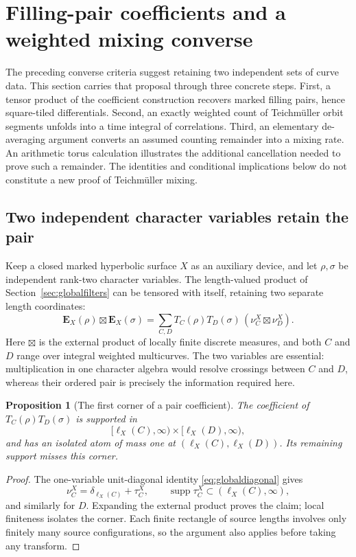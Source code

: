 \documentclass[11pt,a4paper]{article}
\numberwithin{equation}{section}
\newtheorem{proposition}[theorem]{Proposition}
\theoremstyle{definition}
\theoremstyle{remark}
\begin{document}
\clearpage
\section{Filling-pair coefficients and a weighted mixing converse}
\label{sec:pairconverse}

The preceding converse criteria suggest retaining two independent
sets of curve data.  This section carries that proposal through three
concrete steps.  First, a tensor product of the coefficient construction
recovers marked filling pairs, hence square-tiled differentials.
Second, an exactly weighted count of Teichm\"uller orbit segments
unfolds into a time integral of correlations.  Third, an elementary
de-averaging argument converts an assumed counting remainder into
a mixing rate.  An arithmetic torus calculation illustrates the
additional cancellation needed to prove such a remainder.  The
identities and conditional implications below do not constitute a new
proof of Teichm\"uller mixing.

\subsection{Two independent character variables retain the pair}
\label{subsec:paircoefficients}

Keep a closed marked hyperbolic surface $X$ as an auxiliary device,
and let $\rho,\sigma$ be independent rank-two character variables.
The length-valued product of Section~\ref{sec:globalfilters} can be
tensored with itself, retaining two separate length coordinates:
\[
 \mathbf E_X(\rho)\boxtimes\mathbf E_X(\sigma)
 =\sum_{C,D} T_C(\rho)T_D(\sigma)\,
       (\nu_C^X\boxtimes\nu_D^X).
\]
Here $\boxtimes$ is the external product of locally finite discrete
measures, and both $C$ and $D$ range over integral weighted
multicurves.  The two variables are essential: multiplication in
one character algebra would resolve crossings between $C$ and $D$,
whereas their ordered pair is precisely the information required here.

\begin{proposition}[The first corner of a pair coefficient]
\label{prop:pairfirstcorner}
The coefficient of $T_C(\rho)T_D(\sigma)$ is supported in
\[
 [\ell_X(C),\infty)\times[\ell_X(D),\infty),
\]
and has an isolated atom of mass one at
$(\ell_X(C),\ell_X(D))$.  Its remaining support misses this corner.
\end{proposition}

\begin{proof}
The one-variable unit-diagonal identity
\eqref{eq:globaldiagonal} gives
\[
 \nu_C^X=\delta_{\ell_X(C)}+\tau_C^X,
 \qquad \operatorname{supp}\tau_C^X
        \subset(\ell_X(C),\infty),
\]
and similarly for $D$.  Expanding the external product proves the
claim; local finiteness isolates the corner.  Each finite rectangle
of source lengths involves only finitely many source configurations,
so the argument also applies before taking any transform.
\end{proof}
\end{document}
